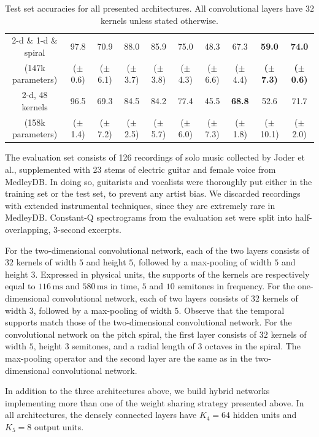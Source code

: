 \documentclass{article}
\makeatletter
\newcommand*{\etal}{et al.\@\xspace}
\newcommand*{\s}[1]{\small{($\pm$ #1)}}
\newcommand*{\g}[1]{\small{\textbf{(}$\boldsymbol{\pm}$ \textbf{#1}\textbf{)}}}
\makeatother
\begin{document}
\begin{table}[t]
\begin{center}
\begin{tabular}{|c|cccccccc|c|}
        \hline
        2-d \& 1-d \& spiral
        & 97.8 & 70.9 & 88.0 & 85.9 & 75.0 & 48.3 & 67.3 & \textbf{59.0} & \textbf{74.0} \\
        (147k parameters)
        &\s{0.6}&\s{6.1}&\s{3.7}&\s{3.8}&\s{4.3}&\s{6.6}&\s{4.4}&\g{7.3}&\g{0.6}\\
        \hline
        2-d, 48 kernels
        & 96.5 & 69.3 & 84.5 & 84.2 & 77.4 & 45.5 & \textbf{68.8} & 52.6 & 71.7\\
        (158k parameters)
        &\s{1.4}&\s{7.2}&\s{2.5}&\s{5.7}&\s{6.0}&\s{7.3}&\s{1.8}&\s{10.1}&\s{2.0}\\
        \hline
    \end{tabular}
    \end{center}
    \caption{Test set accuracies for all presented architectures. All convolutional layers
    have $32$ kernels unless stated otherwise.
    \label{table:results}}
\end{table}


The evaluation set consists of 126 recordings of solo music collected by
Joder \etal \cite{Joder2009}, supplemented with
23 stems of electric guitar and female voice from MedleyDB.
In doing so, guitarists and vocalists were thoroughly put either in the training set or the test set,
to prevent any artist bias.
We discarded recordings with extended instrumental techniques, since they are
extremely rare in MedleyDB.
Constant-Q spectrograms from the evaluation set were split into half-overlapping,
3-second excerpts.

For the two-dimensional convolutional network, each of the two layers consists of
$32$ kernels of width $5$ and height $5$, followed by a max-pooling of width $5$
and height $3$. Expressed in physical units, the supports of the kernels are respectively equal to $116\,\mathrm{ms}$ and $580\,\mathrm{ms}$ in time, $5$ and $10$ semitones in frequency.
For the one-dimensional convolutional network, each of two layers consists of
$32$ kernels of width $3$, followed by a max-pooling of width $5$. Observe that the temporal
supports match those of the two-dimensional convolutional network.
For the convolutional network on the pitch spiral, the first layer consists of $32$ kernels
of width $5$, height $3$ semitones, and a radial length of $3$ octaves in the spiral.
The max-pooling operator and the second layer are the same as in the two-dimensional convolutional network.

In addition to the three architectures above, we build hybrid networks implementing
more than one of the weight sharing strategy presented above.
In all architectures, the densely connected layers have $K_4=64$ hidden units
and $K_5=8$ output units.
\end{document}
